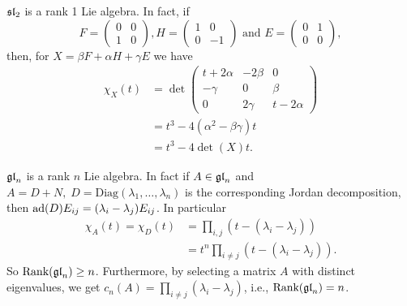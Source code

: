 \begin{dang}
    \begin{example}
         $\mathfrak{sl}_2$ is a rank 1 Lie algebra. In fact, if 
         \begin{equation}
            F=\begin{pmatrix}
                0&0\\1&0
            \end{pmatrix},
            H=\begin{pmatrix}
                1&0\\0&-1
            \end{pmatrix}\text{ and }
            E=\begin{pmatrix}
                0&1\\0&0
            \end{pmatrix},
         \end{equation}
    then, for $X=\beta F+\alpha H+\gamma E$ we have 
    \begin{equation}
        \begin{split}
           \chi_X(t)&=\det \begin{pmatrix}
            t+2\alpha&-2\beta&0\\-\gamma&0&\beta\\0&2\gamma&t-2\alpha
        \end{pmatrix}\\
        &=t^3-4(\alpha^2-\beta\gamma)t\\
         &=t^3-4\det(X)t. 
        \end{split}
    \end{equation}
    \end{example}
\end{dang}

\begin{dang}
    \begin{example}
        $\mathfrak{gl}_n$ is a rank $n$ Lie algebra. In fact if $A\in\mathfrak{gl}_n$ and 
        $A=D+N,\;D=\text{Diag}(\lambda_1,\dots,\lambda_n)$ is the corresponding 
        Jordan decomposition, then $\text{ad}(D)E_{ij}=(\lambda_i-\lambda_j)E_{ij}$. In particular 
        \begin{equation}
            \begin{split}
                \chi_A(t)=\chi_D(t)&=\prod_{i,j}(t-(\lambda_i-\lambda_j))\\
                &=t^n\prod_{i\neq j}(t-(\lambda_i-\lambda_j)).
            \end{split}
        \end{equation}
        So $\text{Rank}(\mathfrak{gl}_n)\geq n$. Furthermore, by selecting a matrix $A$ with distinct eigenvalues, we get  
        $c_n(A)=\prod_{i\neq j}(\lambda_i-\lambda_j)$, i.e.,
        $\text{Rank}(\mathfrak{gl}_n)=n$.
    \end{example}
\end{dang}



